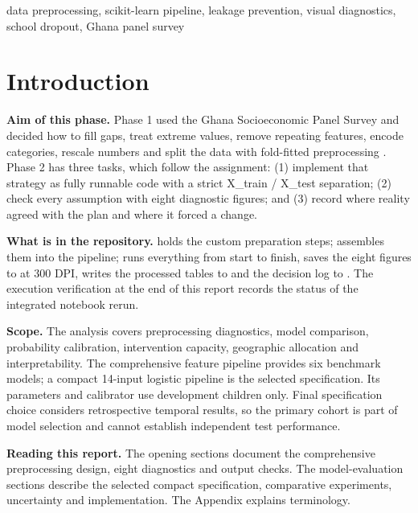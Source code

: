 \documentclass[conference,a4paper]{IEEEtran}
\begin{document}
\begin{IEEEkeywords}
data preprocessing, scikit-learn pipeline, leakage prevention, visual diagnostics, school dropout, Ghana panel survey
\end{IEEEkeywords}

\section{\textbf{Introduction}}
\textbf{Aim of this phase.} Phase 1 used the Ghana Socioeconomic Panel Survey \cite{gsps} and decided how to fill gaps, treat extreme values, remove repeating features, encode categories, rescale numbers and split the data with fold-fitted preprocessing \cite{phase1}. Phase 2 has three tasks, which follow the assignment: (1) implement that strategy as fully runnable code with a strict X\_train / X\_test separation; (2) check every assumption with eight diagnostic figures; and (3) record where reality agreed with the plan and where it forced a change.

\textbf{What is in the repository.}  holds the custom preparation steps;  assembles them into the pipeline;  runs everything from start to finish, saves the eight figures to  at 300 DPI, writes the processed tables to  and the decision log to . The execution verification at the end of this report records the status of the integrated notebook rerun.

\textbf{Scope.} The analysis covers preprocessing diagnostics, model comparison, probability calibration, intervention capacity, geographic allocation and interpretability. The comprehensive feature pipeline provides six benchmark models; a compact 14-input logistic pipeline is the selected specification. Its parameters and calibrator use development children only. Final specification choice considers retrospective temporal results, so the primary cohort is part of model selection and cannot establish independent test performance.

\textbf{Reading this report.} The opening sections document the comprehensive preprocessing design, eight diagnostics and output checks. The model-evaluation sections describe the selected compact specification, comparative experiments, uncertainty and implementation. The Appendix explains terminology.
\end{document}
